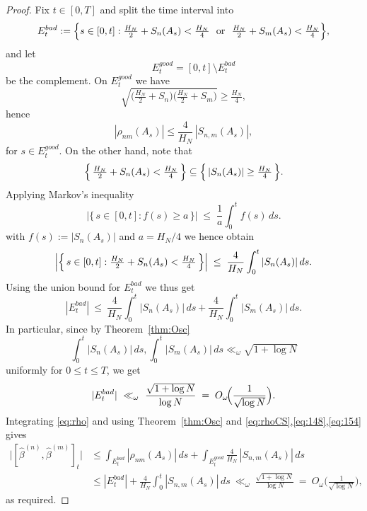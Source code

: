 \documentclass[12pt,reqno]{amsart}
\theoremstyle{plain}
\theoremstyle{definition}
\theoremstyle{remark}
\begin{document}
\begin{proof}
Fix $t\in[0,T]$ and split the time interval into
\begin{equation}
E^{bad}_t:=\Bigl\{s\in[0,t]:
\tfrac{H_N}{2}+S_n(A_s)<\tfrac{H_N}{4}\ \text{ or }\
\tfrac{H_N}{2}+S_m(A_s)<\tfrac{H_N}{4}\Bigr\},
\end{equation}
and let
\begin{equation}
\qquad E_t^{good}=[0,t]\setminus E^{bad}_t 
\end{equation}
be the complement. On $E_t^{good}$ we have
\begin{equation} 
\sqrt{\bigl(\tfrac{H_N}{2}+S_n\bigr)\bigl(\tfrac{H_N}{2}+S_m\bigr)}
\ge \tfrac{H_N}{4},
\end{equation} hence
\begin{equation}
\label{eq:148}
|\rho_{nm}(A_s)| \le \frac{4}{H_N}\,|S_{n,m}(A_s)|,
\end{equation} 
for $s\in E_t^{good}$. On the other hand, note that 
\begin{equation}
\Bigl\{\,\tfrac{H_N}{2}+S_n(A_s)<\tfrac{H_N}{4}\,\Bigr\}
\subseteq \Bigl\{\,|S_n(A_s)|\ge \tfrac{H_N}{4}\,\Bigr\}.
\end{equation}
Applying Markov's inequality
\begin{equation}\label{eq:markov-levelset}
\bigl|\{\,s\in[0,t]: f(s)\ge a\,\}\bigr|
\;\le\; \frac{1}{a}\int_0^t f(s)\,ds .
\end{equation} with $f(s):=|S_n(A_s)|$ and $a=H_N/4$ we hence obtain
\begin{equation}
\Bigl|\Bigl\{\,s\in[0,t]: \tfrac{H_N}{2}+S_n(A_s)<\tfrac{H_N}{4}\,\Bigr\}\Bigr|
\;\le\; \frac{4}{H_N}\int_0^t |S_n(A_s)|\,ds.
\end{equation} 
Using the union bound for $E_t^{bad}$
we thus get
\begin{equation}\label{eq:Et-markov}
|E^{bad}_t|\ \le\ \frac{4}{H_N}\int_0^t |S_n(A_s)|\,ds
          + \frac{4}{H_N}\int_0^t |S_m(A_s)|\,ds .
\end{equation}
In particular, since by Theorem~\ref{thm:Osc}  
\begin{equation}
\int_0^t |S_n(A_s)|\,ds, \int_0^t |S_m(A_s)|\,ds \ll_\omega \sqrt{1+\log N}
\end{equation} uniformly for $0\le t\le T$, we get
\begin{equation}
\label{eq:154}
|E^{bad}_t|\ \ll_\omega\ \frac{\sqrt{1+\log N}}{\log N}
\;=\; O_\omega\!\Bigl(\frac{1}{\sqrt{\log N}}\Bigr).
\end{equation}
Integrating \eqref{eq:rho} and using Theorem~\ref{thm:Osc} and \eqref{eq:rhoCS},\eqref{eq:148},\eqref{eq:154} gives
\begin{align*}
\big|[\hat\beta^{(n)},\hat\beta^{(m)}]_t\big|
&\le \int_{E^{bad}_t} |\rho_{nm}(A_s)|\,ds
     + \int_{E_t^{good}} \frac{4}{H_N}\,|S_{n,m}(A_s)|\,ds \\
&\le |E^{bad}_t|
     + \frac{4}{H_N}\!\int_0^t\!|S_{n,m}(A_s)|\,ds
 \ \ll_\omega\ \frac{\sqrt{1+\log N}}{\log N}
 \ =\ O_\omega\!\Big(\frac{1}{\sqrt{\log N}}\Big),
\end{align*}
as required.
\end{proof}
\end{document}
